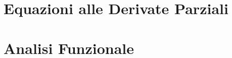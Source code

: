 \documentclass[10pt,a4paper,twoside,openright]{book}
\begin{document}

\tableofcontents



\AtEndDocument{\cleardoublepage}


\mainmatter
\pagestyle{fancy} %


\part{Equazioni alle Derivate Parziali}









\part{Analisi Funzionale}





\end{document}
